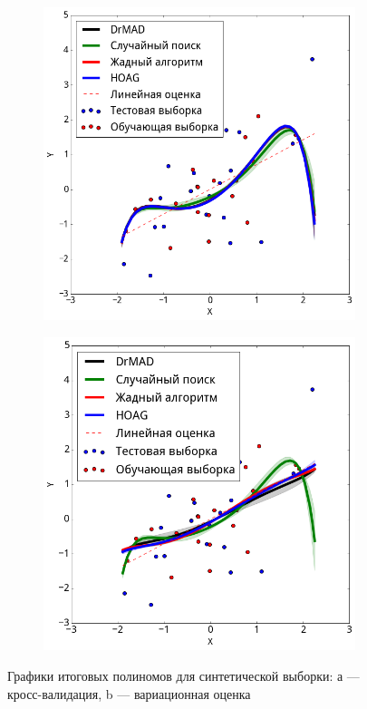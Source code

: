 \documentclass[12pt]{article}
\begin{document}
    \begin{figure}

    \begin{subfigure}[b]{0.5\textwidth}
    \includegraphics[width=0.8\linewidth]{plots/poly_cv.png}

    \end{subfigure}
    \begin{subfigure}[b]{0.5\textwidth}
    \includegraphics[width=0.8\linewidth]{plots/poly_var.png}

    \end{subfigure}

  \label{fig:poly}
    \caption{Графики итоговых полиномов для синтетической выборки: а --- кросс-валидация, b --- вариационная оценка}
    \end{figure}
\end{document}
